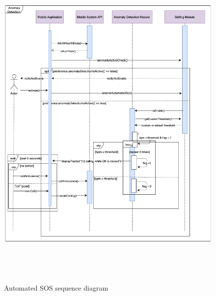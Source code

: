 \begin{figure}[h!]
\centering
\includegraphics[height=17.00cm,keepaspectratio]{Figures/AutomatedSOS}
\caption{Automated SOS sequence diagram}
\end{figure}
\
